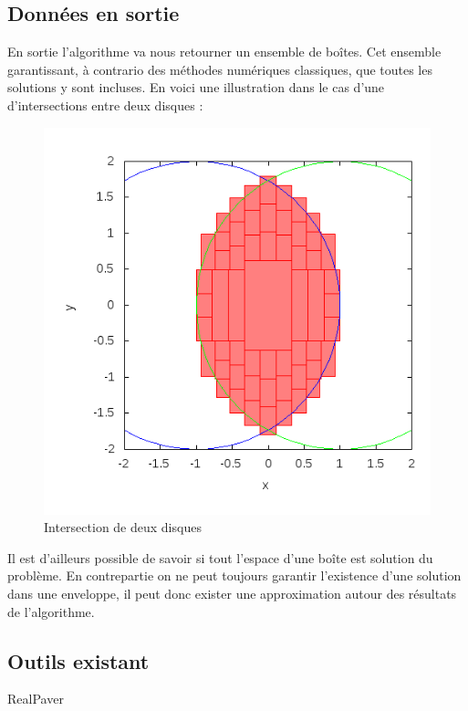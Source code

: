 \subsection{Données en sortie}
En sortie l'algorithme va nous retourner un ensemble de boîtes. Cet ensemble garantissant, à contrario des méthodes numériques classiques, que toutes les solutions y sont incluses. En voici une illustration dans le cas d'une d'intersections entre deux disques : 
\begin{figure}[h] %
  \center
\includegraphics[scale=0.50]{img/disk-disk}
  \caption{Intersection de deux disques} %
 \label{fig:DisqueDisque} %
\end{figure} %

 Il est d'ailleurs possible de savoir si tout l'espace d'une boîte est solution du problème. En contrepartie on ne peut toujours garantir l'existence d'une solution dans une enveloppe, il peut donc exister une approximation autour des résultats de l'algorithme.
 \subsection{Outils existant}
\begin{description}
 \item [RealPaver]
\end{description}
